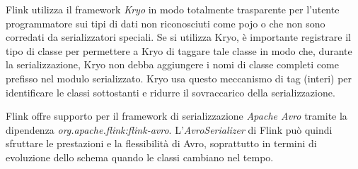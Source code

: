 \label{sec:kryo}
Flink utilizza il \gls{framework} \textit{Kryo} in modo totalmente trasparente per l'utente programmatore sui tipi di dati non riconosciuti come \gls{pojo} o che non sono corredati da serializzatori speciali. Se si utilizza Kryo, è importante registrare il tipo di classe per permettere a Kryo di taggare tale classe in modo che, durante la \gls{serializzazione}, Kryo non debba aggiungere i nomi di classe completi come prefisso nel modulo serializzato. Kryo usa questo meccanismo di tag (interi) per identificare le classi sottostanti e ridurre il sovraccarico della \gls{serializzazione}.



\label{sec:avro}
Flink offre supporto per il \gls{framework} di \gls{serializzazione} \textit{Apache Avro} tramite la dipendenza \textit{org.apache.flink:flink-avro}. L'\textit{AvroSerializer} di Flink può quindi sfruttare le prestazioni e la flessibilità di Avro, soprattutto in termini di evoluzione dello schema quando le classi cambiano nel tempo.
